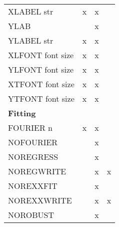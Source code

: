 \begin{table}[h]
\begin{center}
\begin{tabular}{lccc}
XLABEL  str                      &     x     &     x  &                    \\
YLAB                             &           &     x  &                    \\
YLABEL  str                      &     x     &     x  &                    \\
XLFONT  font   size              &     x     &     x  &                    \\
YLFONT  font   size              &     x     &     x  &                    \\
XTFONT  font   size              &     x     &     x  &                    \\
YTFONT  font   size              &     x     &     x  &                    \\ \hline
%  
{\bf Fitting}                    &           &        &                    \\
FOURIER  n                       &     x     &     x  &                    \\
NOFOURIER                        &           &     x  &                    \\
NOREGRESS                        &           &     x  &                    \\
NOREGWRITE                       &           &     x  &       x            \\
NOREXXFIT                        &           &     x  &                    \\
NOREXXWRITE                      &           &     x  &       x            \\
NOROBUST                         &           &     x  &                    \\

\end{tabular}
\end{center}
\end{table}
